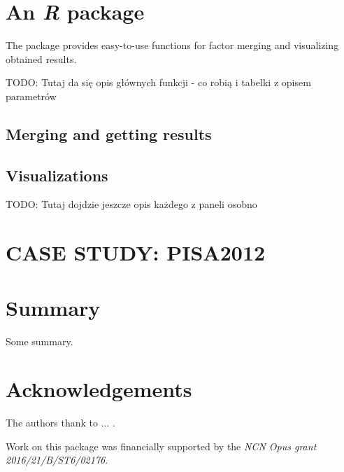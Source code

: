 \section{An \emph{R} package \factorMerger}

The \factorMerger package provides easy-to-use functions for factor merging and visualizing obtained results. 

TODO: Tutaj da się opis głównych funkcji - co robią i tabelki z opisem parametrów

\subsection{Merging and getting results}

\subsection{Visualizations}

TODO: Tutaj dojdzie jeszcze opis każdego z paneli osobno

\section{CASE STUDY: PISA2012}


\section{Summary}

Some summary. 
\section{Acknowledgements}

The authors thank to ... .

Work on this package was financially supported by the \emph{NCN Opus grant 2016/21/B/ST6/02176}.




\address{Agnieszka Sitko \\
  University of Warsaw\\
  Faculty of Mathematics, 
  Informatics and Mechanics\\
  Poland \\
  }

\address{Przemysław Biecek \\
  University of Warsaw \\
  Institute of Applied Mathematics and Mechanics\\
  Poland\\
  }
